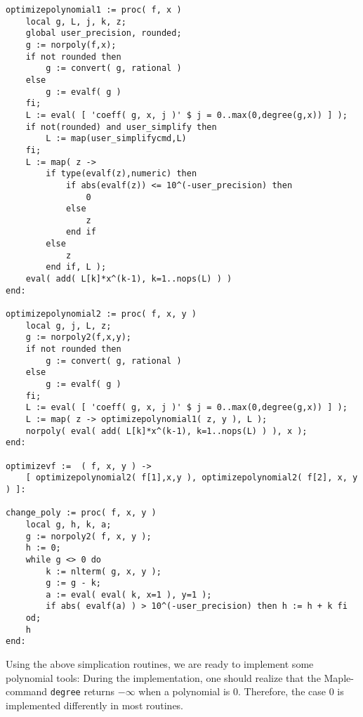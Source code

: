 \documentclass[a4paper,10pt]{article}
\begin{document}
\begin{lstlisting}[name=tools]
optimizepolynomial1 := proc( f, x )
    local g, L, j, k, z;
    global user_precision, rounded;
    g := norpoly(f,x);
    if not rounded then
        g := convert( g, rational )
    else
        g := evalf( g )
    fi;
    L := eval( [ 'coeff( g, x, j )' $ j = 0..max(0,degree(g,x)) ] );
    if not(rounded) and user_simplify then
        L := map(user_simplifycmd,L)
    fi;
    L := map( z ->
        if type(evalf(z),numeric) then
            if abs(evalf(z)) <= 10^(-user_precision) then
                0
            else
                z
            end if
        else
            z
        end if, L );
    eval( add( L[k]*x^(k-1), k=1..nops(L) ) )
end:

optimizepolynomial2 := proc( f, x, y )
    local g, j, L, z;
    g := norpoly2(f,x,y);
    if not rounded then
        g := convert( g, rational )
    else
        g := evalf( g )
    fi;
    L := eval( [ 'coeff( g, x, j )' $ j = 0..max(0,degree(g,x)) ] );
    L := map( z -> optimizepolynomial1( z, y ), L );
    norpoly( eval( add( L[k]*x^(k-1), k=1..nops(L) ) ), x );
end:

optimizevf :=  ( f, x, y ) ->
    [ optimizepolynomial2( f[1],x,y ), optimizepolynomial2( f[2], x, y ) ]:

change_poly := proc( f, x, y )
    local g, h, k, a;
    g := norpoly2( f, x, y );
    h := 0;
    while g <> 0 do
        k := nlterm( g, x, y );
        g := g - k;
        a := eval( eval( k, x=1 ), y=1 );
        if abs( evalf(a) ) > 10^(-user_precision) then h := h + k fi
    od;
    h
end:

\end{lstlisting}

Using the above simplication routines, we are ready to implement some polynomial tools:
During the implementation, one should realize that the Maple-command \verb+degree+ returns $-\infty$ when
a polynomial is $0$.  Therefore, the case $0$ is implemented differently in most routines.
\end{document}
